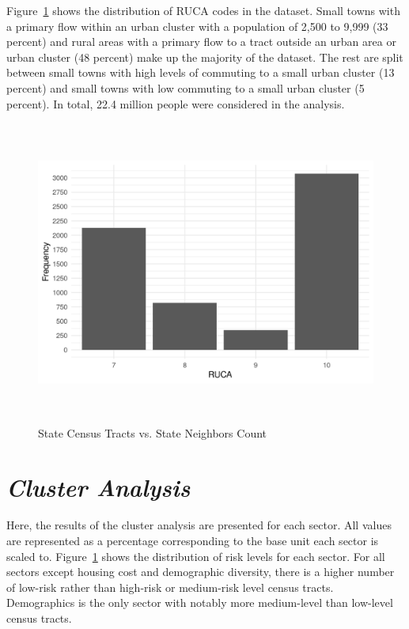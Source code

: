 Figure~\ref{fig:ruca_frequency} shows the distribution of RUCA codes in the dataset. Small towns with a primary flow within an urban cluster with a population of 2,500 to 9,999 (33 percent) and rural areas with a primary flow to a tract outside an urban area or urban cluster (48 percent) make up the majority of the dataset. The rest are split between small towns with high levels of commuting to a small urban cluster (13 percent) and small towns with low commuting to a small urban cluster  (5 percent). In total, 22.4 million people were considered in the analysis. 

\begin{figure}[htbp]
    \centering
     \includegraphics[width=1\textwidth, height=10cm]{plots/ruca_frequency.png}
     \caption{State Census Tracts vs. State Neighbors Count}
     \label{fig:ruca_frequency}
 \end{figure}
 


\section{\textit{Cluster Analysis}}
Here, the results of the cluster analysis are presented for each sector. All values are represented as a percentage corresponding to the base unit each sector is scaled to. Figure~\ref{fig:ruca_frequency} shows the distribution of risk levels for each sector. For all sectors except housing cost and demographic diversity, there is a higher number of low-risk rather than high-risk or medium-risk level census tracts. Demographics is the only sector with notably more medium-level than low-level census tracts. 

